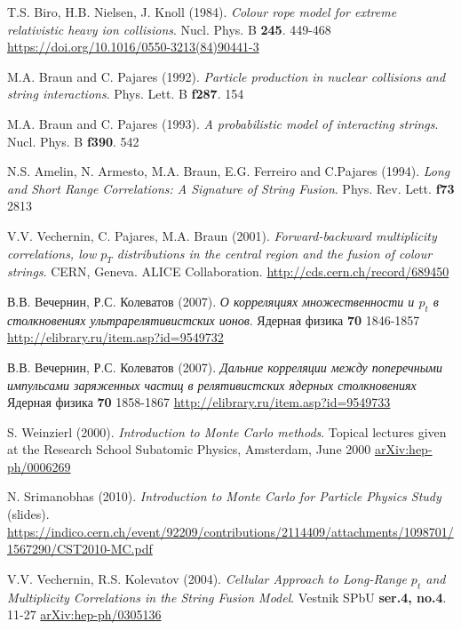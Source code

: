 \begin{thebibliography}{24}
T.S. Biro, H.B. Nielsen, J. Knoll (1984).
\textit{Colour rope model for extreme relativistic heavy ion collisions}.
Nucl. Phys. B 
\textbf{245}.
449-468
\url{https://doi.org/10.1016/0550-3213(84)90441-3}

M.A. Braun and C. Pajares (1992).
\textit{Particle production in nuclear collisions and string interactions}.
Phys. Lett. B 
\textbf{f287}.
154

M.A. Braun and C. Pajares (1993).
\textit{A probabilistic model of interacting strings}.
Nucl. Phys. B
\textbf{f390}.
542 

N.S. Amelin, N. Armesto, M.A. Braun, E.G. Ferreiro and C.Pajares (1994).
\textit{Long and Short Range Correlations: A Signature of String Fusion}.
Phys. Rev. Lett.
\textbf{f73}
2813

V.V. Vechernin, C. Pajares, M.A. Braun (2001).
\textit{Forward-backward multiplicity correlations, low $p_T$ distributions in the central region and the fusion of colour strings}.
CERN, Geneva.
ALICE Collaboration.
\url{http://cds.cern.ch/record/689450}

В.В. Вечернин, Р.С. Колеватов (2007).
\textit{О корреляциях множественности и $p_t$ в столкновениях ультрарелятивистских ионов}.
Ядерная физика
\textbf{70}
1846-1857
\url{http://elibrary.ru/item.asp?id=9549732}

В.В. Вечернин, Р.С. Колеватов (2007).
\textit{Дальние корреляции между поперечными импульсами заряженных частиц в релятивистских ядерных столкновениях}
Ядерная физика
\textbf{70}
1858-1867
\url{http://elibrary.ru/item.asp?id=9549733}

S. Weinzierl (2000).
\textit{Introduction to Monte Carlo methods}.
Topical lectures given at the Research School Subatomic Physics, Amsterdam, June 2000
\href{https://arxiv.org/abs/hep-ph/0006269v1}{arXiv:hep-ph/0006269}

N. Srimanobhas (2010).
\textit{Introduction to Monte Carlo for Particle Physics Study} (slides).
\url{https://indico.cern.ch/event/92209/contributions/2114409/attachments/1098701/1567290/CST2010-MC.pdf}

V.V. Vechernin, R.S. Kolevatov (2004).
\textit{Cellular Approach to Long-Range $p_t$ and Multiplicity Correlations in the String Fusion Model}.
Vestnik SPbU
\textbf{ser.4, no.4}.
11-27
\href{https://arxiv.org/abs/hep-ph/0305136}{arXiv:hep-ph/0305136}


\end{thebibliography}
